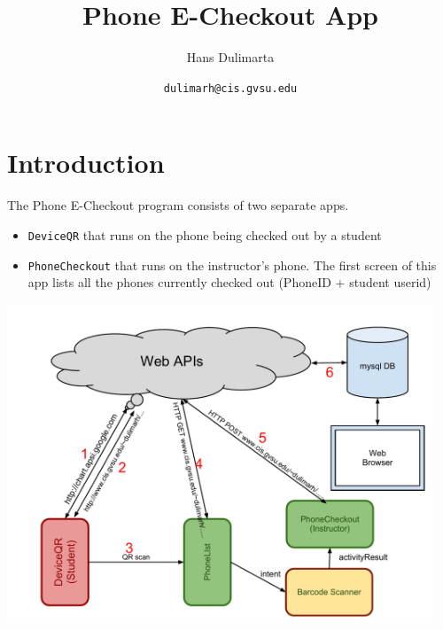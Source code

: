 \documentclass[11pt]{article} %
\title{Phone E-Checkout App}
\author{Hans Dulimarta}
\date{\texttt{dulimarh@cis.gvsu.edu}}
\begin{document}
\landscape
\maketitle

\section{Introduction}
The Phone E-Checkout program consists of two separate apps.
\begin{itemize}
\item \texttt{DeviceQR} that runs on the phone being checked out by a student
\item \texttt{PhoneCheckout} that runs on the instructor's phone. The
first screen of this app lists all the phones currently checked out
(PhoneID + student userid)
\end{itemize}

\includegraphics[width=5in]{PhoneCheckout}
\end{document}
